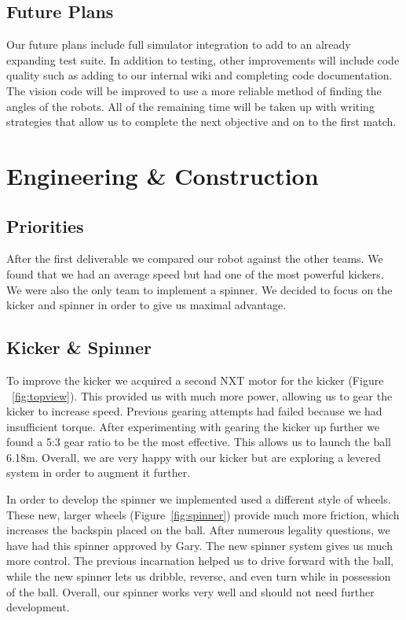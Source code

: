 \documentclass[12pt, a4paper, titlepage]{article}
\begin{document}
\subsection{Future Plans}

Our future plans include full simulator integration to add to an already
expanding test suite. In addition to testing, other improvements will
include code quality such as adding to our internal wiki and completing code
documentation. The vision code will be improved to use a more reliable method
of finding the angles of the robots. All of the remaining time will be taken up
with writing strategies that allow us to complete the next objective and on to
the first match.

\section{Engineering \& Construction}

\subsection{Priorities}

After the first deliverable we compared our robot against the other teams. We
found that we had an average speed but had one of the most powerful kickers.
We were also the only team to implement a spinner. We decided to focus on the
kicker and spinner in order to give us maximal advantage.

\subsection{Kicker \& Spinner}

To improve the kicker we acquired a second NXT motor for the kicker (Figure
~\ref{fig:topview}). This provided us with much more power, allowing us to gear
the kicker to increase speed. Previous gearing attempts had failed because we
had insufficient torque. After experimenting with gearing the kicker up further
we found a 5:3 gear ratio to be the most effective. This allows us to launch the
ball 6.18m. Overall, we are very happy with our kicker but are exploring a
levered system in order to augment it further.

In order to develop the spinner we implemented used a different style of wheels.
These new, larger wheels (Figure~\ref{fig:spinner}) provide much more friction,
which increases the backspin placed on the ball. After numerous legality
questions, we have had this spinner approved by Gary. The new spinner system
gives us much more control. The previous incarnation helped us to drive forward
with the ball, while the new spinner lets us dribble, reverse, and even turn
while in possession of the ball. Overall, our spinner works very well and should
not need further development.
\end{document}
